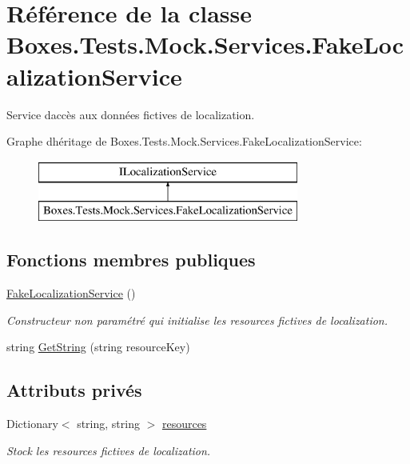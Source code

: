 \hypertarget{class_boxes_1_1_tests_1_1_mock_1_1_services_1_1_fake_localization_service}{}\section{Référence de la classe Boxes.\+Tests.\+Mock.\+Services.\+Fake\+Localization\+Service}
\label{class_boxes_1_1_tests_1_1_mock_1_1_services_1_1_fake_localization_service}


Service d\textquotesingle{}accès aux données fictives de localization.  


Graphe d\textquotesingle{}héritage de Boxes.\+Tests.\+Mock.\+Services.\+Fake\+Localization\+Service\+:\begin{figure}[H]
\begin{center}
\leavevmode
\includegraphics[height=2.000000cm]{class_boxes_1_1_tests_1_1_mock_1_1_services_1_1_fake_localization_service}
\end{center}
\end{figure}
\subsection*{Fonctions membres publiques}
\begin{DoxyCompactItemize}
\item 
\hyperlink{class_boxes_1_1_tests_1_1_mock_1_1_services_1_1_fake_localization_service_ae9f699f8c57a498f3e2cec76f118e57b}{Fake\+Localization\+Service} ()
\begin{DoxyCompactList}\small\item\em Constructeur non paramétré qui initialise les resources fictives de localization. \end{DoxyCompactList}\item 
string \hyperlink{class_boxes_1_1_tests_1_1_mock_1_1_services_1_1_fake_localization_service_ae8683fc6f58a0f8b223144f055d26a31}{Get\+String} (string resource\+Key)
\end{DoxyCompactItemize}
\subsection*{Attributs privés}
\begin{DoxyCompactItemize}
\item 
Dictionary$<$ string, string $>$ \hyperlink{class_boxes_1_1_tests_1_1_mock_1_1_services_1_1_fake_localization_service_a330124480defe0c22cb0b12037c44450}{resources}
\begin{DoxyCompactList}\small\item\em Stock les resources fictives de localization. \end{DoxyCompactList}\end{DoxyCompactItemize}


